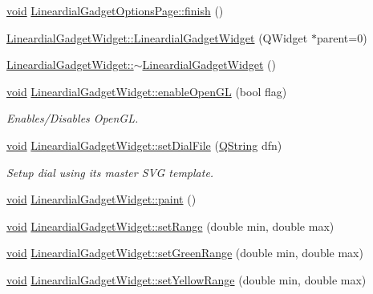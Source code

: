 \begin{DoxyCompactItemize}
\item 
\hyperlink{group___u_a_v_objects_plugin_ga444cf2ff3f0ecbe028adce838d373f5c}{void} \hyperlink{group___linear_dial_plugin_ga5afd30269776667128093b5ec5bef9de}{\-Lineardial\-Gadget\-Options\-Page\-::finish} ()
\item 
\hyperlink{group___linear_dial_plugin_ga67af774f5fa476bda0dce880d57348a7}{\-Lineardial\-Gadget\-Widget\-::\-Lineardial\-Gadget\-Widget} (\-Q\-Widget $\ast$parent=0)
\item 
\hyperlink{group___linear_dial_plugin_ga46b2275fc21a5a5fc14809f31be48674}{\-Lineardial\-Gadget\-Widget\-::$\sim$\-Lineardial\-Gadget\-Widget} ()
\item 
\hyperlink{group___u_a_v_objects_plugin_ga444cf2ff3f0ecbe028adce838d373f5c}{void} \hyperlink{group___linear_dial_plugin_ga6963a6b647b9d9def0497b60df89d576}{\-Lineardial\-Gadget\-Widget\-::enable\-Open\-G\-L} (bool flag)
\begin{DoxyCompactList}\small\item\em \-Enables/\-Disables \-Open\-G\-L. \end{DoxyCompactList}\item 
\hyperlink{group___u_a_v_objects_plugin_ga444cf2ff3f0ecbe028adce838d373f5c}{void} \hyperlink{group___linear_dial_plugin_ga5242e6b2ecad5fb0d80b13f5e989c671}{\-Lineardial\-Gadget\-Widget\-::set\-Dial\-File} (\hyperlink{group___u_a_v_objects_plugin_gab9d252f49c333c94a72f97ce3105a32d}{\-Q\-String} dfn)
\begin{DoxyCompactList}\small\item\em \-Setup dial using its master \-S\-V\-G template. \end{DoxyCompactList}\item 
\hyperlink{group___u_a_v_objects_plugin_ga444cf2ff3f0ecbe028adce838d373f5c}{void} \hyperlink{group___linear_dial_plugin_ga90222159d9de45fe9f4321c30e3f536a}{\-Lineardial\-Gadget\-Widget\-::paint} ()
\item 
\hyperlink{group___u_a_v_objects_plugin_ga444cf2ff3f0ecbe028adce838d373f5c}{void} \hyperlink{group___linear_dial_plugin_ga659bce00c419425ed6e5e03095b06e3c}{\-Lineardial\-Gadget\-Widget\-::set\-Range} (double min, double max)
\item 
\hyperlink{group___u_a_v_objects_plugin_ga444cf2ff3f0ecbe028adce838d373f5c}{void} \hyperlink{group___linear_dial_plugin_ga46b699d52d4dea2d6b6ff2b37a5657b0}{\-Lineardial\-Gadget\-Widget\-::set\-Green\-Range} (double min, double max)
\item 
\hyperlink{group___u_a_v_objects_plugin_ga444cf2ff3f0ecbe028adce838d373f5c}{void} \hyperlink{group___linear_dial_plugin_ga109a0d550537110c81433ec36eaea6ba}{\-Lineardial\-Gadget\-Widget\-::set\-Yellow\-Range} (double min, double max)

\end{DoxyCompactItemize}
